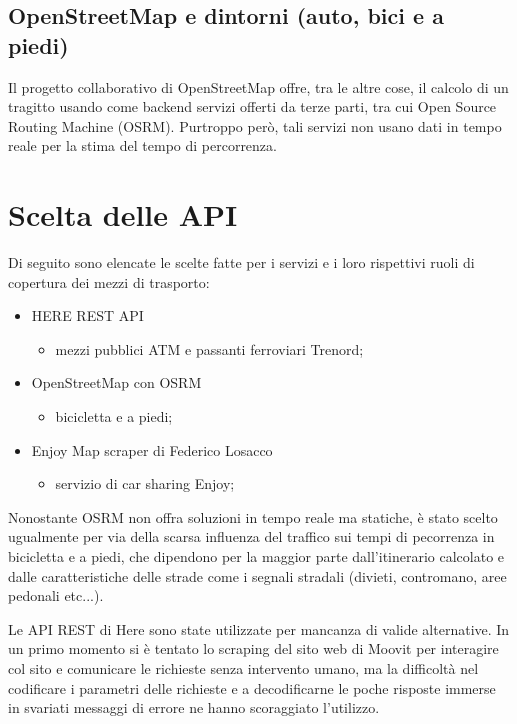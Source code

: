\subsection{OpenStreetMap e dintorni (auto, bici e a piedi)}

Il progetto collaborativo di OpenStreetMap offre, tra le altre cose, il calcolo di un tragitto usando come backend servizi offerti da terze parti, tra cui Open Source Routing Machine (OSRM). Purtroppo però, tali servizi non usano dati in tempo reale per la stima del tempo di percorrenza\cite{osm}.

\section{Scelta delle API}

Di seguito sono elencate le scelte fatte per i servizi e i loro rispettivi ruoli di copertura dei mezzi di trasporto:

\begin{itemize}
	\item HERE REST API\cite{herewegoapi}
	\begin{itemize}
		\item mezzi pubblici ATM e passanti ferroviari Trenord;
	\end{itemize}

	\item OpenStreetMap con OSRM\cite{openstreetmap}
	\begin{itemize}
		\item bicicletta e a piedi;
	\end{itemize}

	\item Enjoy Map scraper di Federico Losacco\cite{enjoycarsharing}\cite{losaccofederico}
	\begin{itemize}
		\item servizio di car sharing Enjoy;
	\end{itemize}
\end{itemize}
Nonostante OSRM non offra soluzioni in tempo reale ma statiche, è stato scelto ugualmente per via della scarsa influenza del traffico sui tempi di pecorrenza in bicicletta e a piedi, che dipendono per la maggior parte dall'itinerario calcolato e dalle caratteristiche delle strade come i segnali stradali (divieti, contromano, aree pedonali etc...).

Le API REST di Here sono state utilizzate per mancanza di valide alternative. In un primo momento si è tentato lo scraping del sito web di Moovit per interagire col sito e comunicare le richieste senza intervento umano, ma la difficoltà nel codificare i parametri delle richieste e a decodificarne le poche risposte immerse in svariati messaggi di errore ne hanno scoraggiato l'utilizzo.

